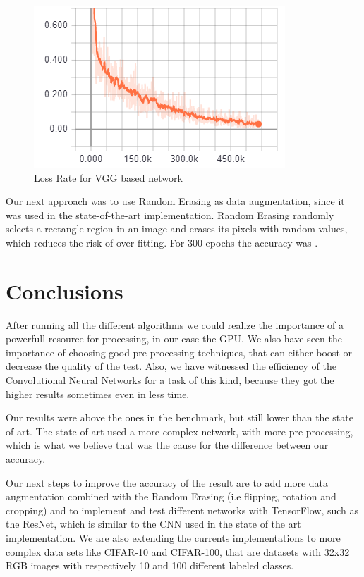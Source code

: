\documentclass[twoside,twocolumn]{article}
\begin{document}
    
    \begin{figure}[h]
    \begin{center}
		\includegraphics[scale=0.6]{lossRateVGG.png}
        \caption{Loss Rate for VGG based network\label{fig:lossRateVGG}}    
    \end{center}
    \end{figure}
    
    Our next approach was to use Random Erasing as data augmentation, since it was used in the state-of-the-art implementation. Random Erasing randomly
selects a rectangle region in an image and erases its pixels with random values, which reduces the risk of over-fitting. For 300 epochs the accuracy was .


	\section{Conclusions}
	
	After running all the different algorithms we could realize the importance of a powerfull resource for processing, in our case the GPU. We also have seen the importance of choosing good pre-processing techniques, that can either boost or decrease the quality of the test.
	Also, we have witnessed the efficiency of the Convolutional Neural Networks for a task of this kind, because they got the higher results sometimes even in less time.
	
	Our results were above the ones in the benchmark, but still lower than the state of art. The state of art used a more complex network, with more pre-processing, which is what we believe that was the cause for the difference between our accuracy.
	
	Our next steps to improve the accuracy of the result are to add more data augmentation combined with the Random Erasing (i.e flipping, rotation and cropping) and to implement and test different networks with TensorFlow, such as the ResNet, which is similar to the CNN used in the state of the art implementation.
	We are also extending the currents implementations to more complex data sets like CIFAR-10 and CIFAR-100, that are datasets with 32x32 RGB images with respectively 10 and 100 different labeled classes.
    





\end{document}
